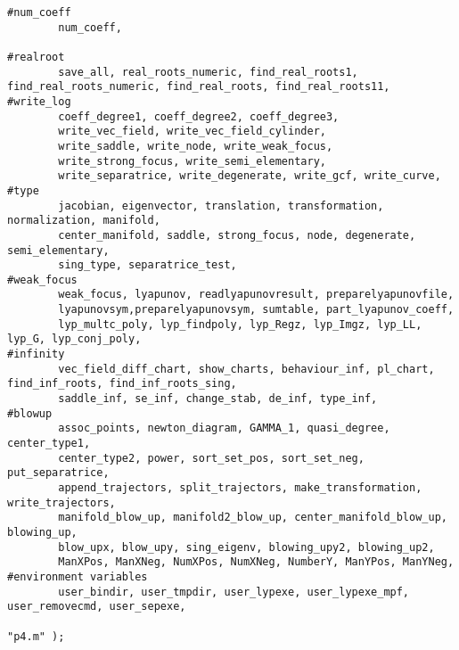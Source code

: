 \documentclass[a4paper,10pt]{article}
\begin{document}
\begin{lstlisting}[name=main]
#num_coeff
        num_coeff,

#realroot
        save_all, real_roots_numeric, find_real_roots1, find_real_roots_numeric, find_real_roots, find_real_roots11,
#write_log
        coeff_degree1, coeff_degree2, coeff_degree3,
        write_vec_field, write_vec_field_cylinder,
        write_saddle, write_node, write_weak_focus,
        write_strong_focus, write_semi_elementary,
        write_separatrice, write_degenerate, write_gcf, write_curve,
#type
        jacobian, eigenvector, translation, transformation, normalization, manifold,
        center_manifold, saddle, strong_focus, node, degenerate, semi_elementary,
        sing_type, separatrice_test,
#weak_focus
        weak_focus, lyapunov, readlyapunovresult, preparelyapunovfile,
        lyapunovsym,preparelyapunovsym, sumtable, part_lyapunov_coeff,
        lyp_multc_poly, lyp_findpoly, lyp_Regz, lyp_Imgz, lyp_LL, lyp_G, lyp_conj_poly,
#infinity
        vec_field_diff_chart, show_charts, behaviour_inf, pl_chart, find_inf_roots, find_inf_roots_sing,
        saddle_inf, se_inf, change_stab, de_inf, type_inf,
#blowup
        assoc_points, newton_diagram, GAMMA_1, quasi_degree, center_type1,
        center_type2, power, sort_set_pos, sort_set_neg, put_separatrice,
        append_trajectors, split_trajectors, make_transformation, write_trajectors,
        manifold_blow_up, manifold2_blow_up, center_manifold_blow_up, blowing_up,
        blow_upx, blow_upy, sing_eigenv, blowing_upy2, blowing_up2,
        ManXPos, ManXNeg, NumXPos, NumXNeg, NumberY, ManYPos, ManYNeg,
#environment variables
        user_bindir, user_tmpdir, user_lypexe, user_lypexe_mpf, user_removecmd, user_sepexe,

"p4.m" );
\end{lstlisting}
\end{document}
